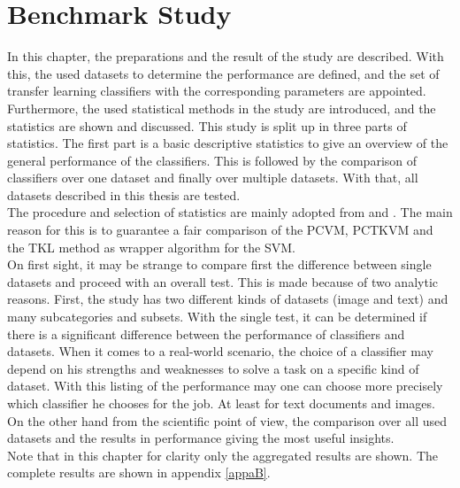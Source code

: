 \chapter{Benchmark Study}\label{EmChap}
In this chapter, the preparations and the result of the study are described.
With this, the used datasets to determine the performance are defined, and the set of transfer learning classifiers with the corresponding parameters are appointed.\\
Furthermore, the used statistical methods in the study are introduced, and the statistics are shown and discussed.
This study is split up in three parts of statistics.
The first part is a basic descriptive statistics to give an overview of the general performance of the classifiers.
This is followed by the comparison of classifiers over one dataset and finally over multiple datasets.
With that, all datasets described in this thesis are tested.\\
The procedure and selection of statistics are mainly adopted from \cite{Chen.2009} and \cite{Long.2015}.
The main reason for this is to guarantee a fair comparison of the \acs{PCVM}, \acs{PCTKVM} and the \acs{TKL} method as wrapper algorithm for the \acs{SVM}.\\
On first sight, it may be strange to compare first the difference between single datasets and proceed with an overall test.
This is made because of two analytic reasons. First, the study has two different kinds of datasets (image and text) and many subcategories and subsets.
With the single test, it can be determined if there is a significant difference between the performance of classifiers and datasets.
When it comes to a real-world scenario, the choice of a classifier may depend on his strengths and weaknesses to solve a task on a specific kind of dataset.
With this listing of the performance may one can choose more precisely which classifier he chooses for the job. At least for text documents and images.\\
On the other hand from the scientific point of view, the comparison over all used datasets and the results in performance giving the most useful insights.\\
Note that in this chapter for clarity only the aggregated results are shown. The complete results are shown in appendix \ref{appaB}.

